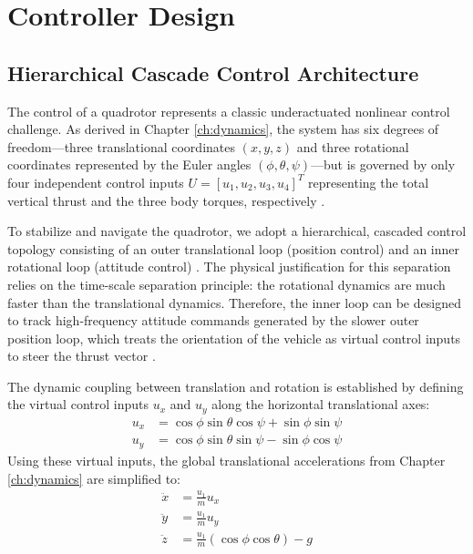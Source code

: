 \chapter{Controller Design}
\label{ch:controller_design}

\section{Hierarchical Cascade Control Architecture}
The control of a quadrotor represents a classic underactuated nonlinear control challenge. As derived in Chapter \ref{ch:dynamics}, the system has six degrees of freedom—three translational coordinates $(x, y, z)$ and three rotational coordinates represented by the Euler angles $(\phi, \theta, \psi)$—but is governed by only four independent control inputs $U = [u_1, u_2, u_3, u_4]^T$ representing the total vertical thrust and the three body torques, respectively \cite{ref_77}. 

To stabilize and navigate the quadrotor, we adopt a hierarchical, cascaded control topology consisting of an outer translational loop (position control) and an inner rotational loop (attitude control) \cite{ref_78}. The physical justification for this separation relies on the time-scale separation principle: the rotational dynamics are much faster than the translational dynamics. Therefore, the inner loop can be designed to track high-frequency attitude commands generated by the slower outer position loop, which treats the orientation of the vehicle as virtual control inputs to steer the thrust vector \cite{ref_78}.

The dynamic coupling between translation and rotation is established by defining the virtual control inputs $u_x$ and $u_y$ along the horizontal translational axes:
\begin{align}
u_x &= \cos\phi \sin\theta \cos\psi + \sin\phi \sin\psi \\
u_y &= \cos\phi \sin\theta \sin\psi - \sin\phi \cos\psi
\end{align}
Using these virtual inputs, the global translational accelerations from Chapter \ref{ch:dynamics} are simplified to:
\begin{align}
\ddot{x} &= \frac{u_1}{m} u_x \\
\ddot{y} &= \frac{u_1}{m} u_y \\
\ddot{z} &= \frac{u_1}{m} (\cos\phi \cos\theta) - g
\end{align}

